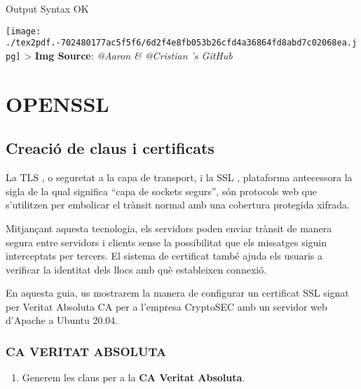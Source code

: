 \documentclass[]{article}
\newenvironment{Shaded}{}{}
\newcommand{\ExtensionTok}[1]{#1}
\newcommand{\NormalTok}[1]{#1}
\providecommand{\tightlist}{%
  \setlength{\itemsep}{0pt}\setlength{\parskip}{0pt}}
\begin{document}
\begin{Shaded}
\begin{Highlighting}[]
\ExtensionTok{Output}
\ExtensionTok{Syntax}\NormalTok{ OK}
\end{Highlighting}
\end{Shaded}

\texttt{[image: ./tex2pdf.-702480177ac5f5f6/6d2f4e8fb053b26cfd4a36864fd8abd7c02068ea.jpg]}
\textgreater{} \textbf{Img Source}: \emph{@Aaron \& @Cristian 's GitHub}

\hypertarget{openssl}{%
\section{\texorpdfstring{\textbf{OPENSSL}}{OPENSSL}}\label{openssl}}

\hypertarget{creaciuxf3-de-claus-i-certificats}{%
\subsection{\texorpdfstring{\textbf{Creació de claus i
certificats}}{Creació de claus i certificats}}\label{creaciuxf3-de-claus-i-certificats}}

La TLS , o seguretat a la capa de transport, i la SSL , plataforma
antecessora la sigla de la qual significa ``capa de sockets segurs'',
són protocols web que s'utilitzen per embolicar el trànsit normal amb
una cobertura protegida xifrada.

Mitjançant aquesta tecnologia, els servidors poden enviar trànsit de
manera segura entre servidors i clients sense la possibilitat que els
missatges siguin interceptats per tercers. El sistema de certificat
també ajuda els usuaris a verificar la identitat dels llocs amb què
estableixen connexió.

En aquesta guia, us mostrarem la manera de configurar un certificat SSL
signat per Veritat Absoluta CA per a l'empresa CryptoSEC amb un servidor
web d'Apache a Ubuntu 20.04.

\hypertarget{ca-veritat-absoluta}{%
\subsubsection{\texorpdfstring{\textbf{CA VERITAT
ABSOLUTA}}{CA VERITAT ABSOLUTA}}\label{ca-veritat-absoluta}}

\begin{enumerate}
\def\labelenumi{\arabic{enumi}.}
\tightlist
\item
  Generem les claus per a la \textbf{CA Veritat Absoluta}.
\end{enumerate}
\end{document}
